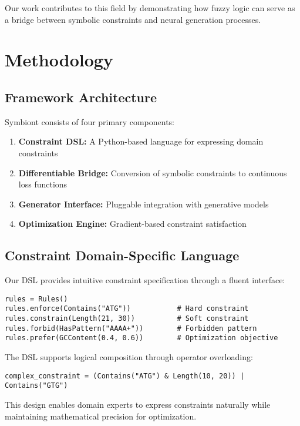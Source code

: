 \documentclass[conference]{IEEEtran}
\begin{document}
Our work contributes to this field by demonstrating how fuzzy logic can serve as a bridge between symbolic constraints and neural generation processes.

\section{Methodology}

\subsection{Framework Architecture}

Symbiont consists of four primary components:

\begin{enumerate}
    \item \textbf{Constraint DSL:} A Python-based language for expressing domain constraints
    \item \textbf{Differentiable Bridge:} Conversion of symbolic constraints to continuous loss functions
    \item \textbf{Generator Interface:} Pluggable integration with generative models
    \item \textbf{Optimization Engine:} Gradient-based constraint satisfaction
\end{enumerate}

\subsection{Constraint Domain-Specific Language}

Our DSL provides intuitive constraint specification through a fluent interface:

\begin{lstlisting}
rules = Rules()
rules.enforce(Contains("ATG"))           # Hard constraint
rules.constrain(Length(21, 30))          # Soft constraint
rules.forbid(HasPattern("AAAA+"))        # Forbidden pattern
rules.prefer(GCContent(0.4, 0.6))        # Optimization objective
\end{lstlisting}

The DSL supports logical composition through operator overloading:
\begin{lstlisting}
complex_constraint = (Contains("ATG") & Length(10, 20)) | Contains("GTG")
\end{lstlisting}

This design enables domain experts to express constraints naturally while maintaining mathematical precision for optimization.
\end{document}

